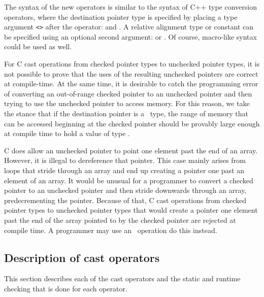 The syntax of the new operators is similar to the syntax of C++ type
conversion operators, where the destination pointer type is specified by
placing a type argument \lstinline|<|\lstinline|>| after the operator: 
and .   A relative alignment type or constant can be
specified using an optional second argument:  
 or .
Of course, macro-like syntax could be used as well.

For C cast operations from checked pointer types to unchecked pointer types,
it is not possible to prove that the uses of the resulting unchecked pointers
are correct at compile-time.   At the same
time, it is desirable to  catch the programming error of converting an out-of-range
checked pointer to an unchecked pointer and then trying to use the unchecked
pointer to access memory.  For this reason, we take the stance that if the
destination pointer is a \uncheckedptrT\ type, the range of memory that can be accessed
beginning at the checked pointer should be provably large enough at compile time
to hold a value of type .

C does allow an unchecked pointer to point one element past the end of an array.
However, it is illegal to dereference that pointer.  This case mainly arises
from loops that stride through an array and end up creating a pointer one past
an element of an array.  It would be unusual for a programmer to
convert a checked pointer to an unchecked pointer and then stride downwards through an array,
predecrementing the pointer.  Because of that, C cast operations from checked pointer
types to unchecked pointer types that would create a pointer one element past
the end of the array pointed to by the checked pointer are rejected at compile time.
A programmer may use an \assumeboundscast\ operation do this instead.

\subsection{Description of cast operators}
\label{subsection:cast-operator-description}

This section describes each of the cast operators and the static
and runtime checking that is done for each operator.   


